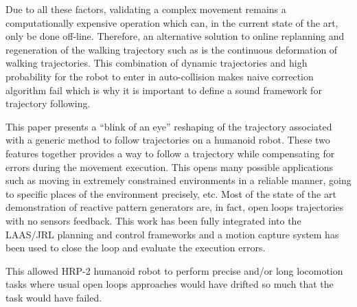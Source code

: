Due to all these factors, validating a complex movement remains a
computationally expensive operation which can, in the current state of
the art, only be done off-line. Therefore, an alternative solution to
online replanning and regeneration of the walking trajectory such as
\cite{11icra.dimitrov, 10ar.herdt, 06icra.nishiwaki, 05humanoids.michel} is
the continuous deformation of walking trajectories.  This combination
of dynamic trajectories and high probability for the robot to enter in
auto-collision makes naive correction algorithm fail which is why it
is important to define a sound framework for trajectory following.


This paper presents a ``blink of an eye'' reshaping of the trajectory
associated with a generic method to follow trajectories on a humanoid
robot. These two features together provides a way to follow a
trajectory while compensating for errors during the movement
execution. This opens many possible applications such as moving in
extremely constrained environments in a reliable manner, going to
specific places of the environment precisely, etc. Most of the state
of the art demonstration of reactive pattern generators are, in fact,
open loops trajectories with no sensors feedback. This work has been
fully integrated into the LAAS/JRL planning and control frameworks and
a motion capture system has been used to close the loop and evaluate
the execution errors.

This allowed HRP-2 humanoid robot to perform precise and/or long
locomotion tasks where usual open loops approaches would have drifted
so much that the task would have failed.

\FloatBarrier

